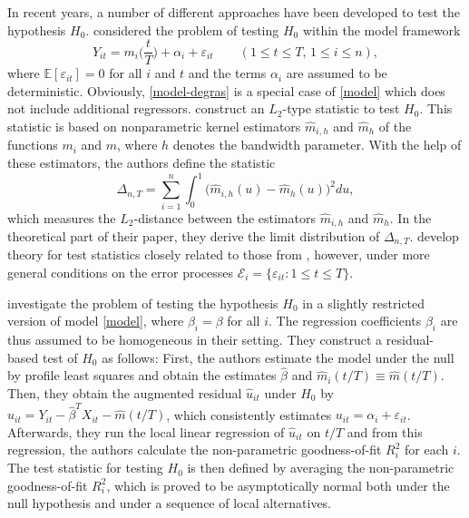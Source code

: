 \documentclass[a4paper,12pt]{article}
\begin{document}
In recent years, a number of different approaches have been developed to test the hypothesis $H_0$. \cite{DegrasWu2012} considered the problem of testing $H_0$ within the model framework
\begin{equation}\label{model-degras}
Y_{it} = m_i \Big( \frac{t}{T} \Big) + \alpha_i + \varepsilon_{it} \qquad (1 \le t \le T, \, 1 \le i \le n), 
\end{equation}
where $\mathbb{E}[\varepsilon_{it}] = 0$ for all $i$ and $t$ and the terms $\alpha_i$ are assumed to be deterministic. Obviously, \eqref{model-degras} is a special case of \eqref{model} which does not include additional regressors. \cite{DegrasWu2012} construct an $L_2$-type statistic to test $H_0$. This statistic is based on nonparametric kernel estimators $\widehat{m}_{i,h}$ and $\widehat{m}_h$ of the functions $m_i$ and $m$, where $h$ denotes the bandwidth parameter. With the help of these estimators, the authors define the statistic
\[ \Delta_{n,T} = \sum_{i=1}^n \int_0^1 \big(\widehat{m}_{i,h}(u) - \widehat{m}_h(u)\big)^2 du, \] 
which measures the $L_2$-distance between the estimators $\widehat{m}_{i, h}$ and $\widehat{m}_h$. In the theoretical part of their paper, they derive the limit distribution of $\Delta_{n,T}$. 
\cite{ChenWu2018} develop theory for test statistics closely related to those from \cite{DegrasWu2012}, however, under more general conditions on the error processes $\mathcal{E}_i = \{ \varepsilon_{it}: 1 \le t \le T \}$. 

\cite{Zhang2012} investigate the problem of testing the hypothesis $H_0$ in a slightly restricted version of model \eqref{model}, where $\beta_i = \beta$ for all $i$. The regression coefficients $\beta_i$ are thus assumed to be homogeneous in their setting. They construct a residual-based test of $H_0$ as follows: First, the authors estimate the model under the null by profile least squares and obtain the estimates $\widehat{\beta}$ and $\widehat{m}_i(t/T) \equiv \widehat{m}(t/T)$. Then, they obtain the augmented residual $\widehat{u}_{it}$ under $H_0$ by $\widehat{u}_{it} = Y_{it} - \widehat{\beta}^T X_{it} - \widehat{m}(t/T)$, which consistently estimates $u_{it} = \alpha_i + \varepsilon_{it}$. Afterwards, they run the local linear regression of $\widehat{u}_{it}$ on $t/T$ and from this regression, the authors calculate the non-parametric goodness-of-fit $R_i^2$ for each $i$. The test statistic for testing $H_0$ is then defined by averaging the non-parametric goodness-of-fit $R^2_i$, which is proved to be asymptotically normal both under the null hypothesis and under a sequence of local alternatives.
\end{document}
